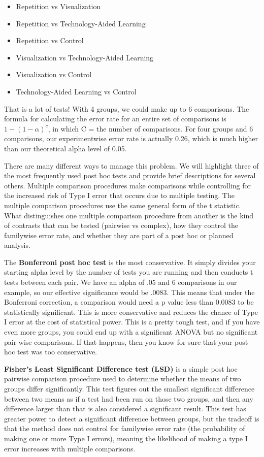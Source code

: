\documentclass[
  letterpaper,
  DIV=11,
  numbers=noendperiod]{scrreprt}
\begin{document}
\begin{itemize}
\item
  Repetition vs Visualization
\item
  Repetition vs Technology-Aided Learning
\item
  Repetition vs Control
\item
  Visualization vs Technology-Aided Learning
\item
  Visualization vs Control
\item
  Technology-Aided Learning vs Control
\end{itemize}

That is a lot of tests! With 4 groups, we could make up to 6
comparisons. The formula for calculating the error rate for an entire
set of comparisons is \(1 − (1−α)^c\), in which C = the number of
comparisons. For four groups and 6 comparisons, our experimentwise error
rate is actually 0.26, which is much higher than our theoretical alpha
level of 0.05.

There are many different ways to manage this problem. We will highlight
three of the most frequently used post hoc tests and provide brief
descriptions for several others. Multiple comparison procedures make
comparisons while controlling for the increased risk of Type I error
that occurs due to multiple testing. The multiple comparison procedures
use the same general form of the t statistic. What distinguishes one
multiple comparison procedure from another is the kind of contrasts that
can be tested (pairwise vs complex), how they control the familywise
error rate, and whether they are part of a post hoc or planned analysis.

The \textbf{Bonferroni post hoc test} is the most conservative. It
simply divides your starting alpha level by the number of tests you are
running and then conducts t tests between each pair. We have an alpha of
.05 and 6 comparisons in our example, so our effective significance
would be .0083. This means that under the Bonferroni correction, a
comparison would need a p value less than 0.0083 to be statistically
significant. This is more conservative and reduces the chance of Type I
error at the cost of statistical power. This is a pretty tough test, and
if you have even more groups, you could end up with a significant ANOVA
but no significant pair-wise comparisons. If that happens, then you know
for sure that your post hoc test was too conservative.

\textbf{Fisher's Least Significant Difference test (LSD)} is a simple
post hoc pairwise comparison procedure used to determine whether the
means of two groups differ significantly. This test figures out the
smallest significant difference between two means as if a test had been
run on those two groups, and then any difference larger than that is
also considered a significant result. This test has greater power to
detect a significant difference between groups, but the tradeoff is that
the method does not control for familywise error rate (the probability
of making one or more Type I errors), meaning the likelihood of making a
type I error increases with multiple comparisons.
\end{document}
